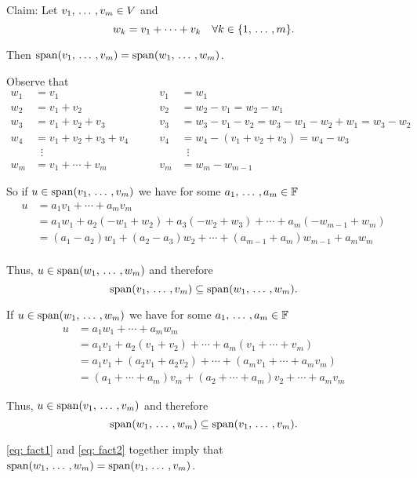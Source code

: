 \begin{xrcs}
  Claim: Let $v_1, {\, \ldots \,\,}, v_m \in V$ and
  \[
    w_k = v_1 + \cdots + v_k \quad \forall k\in \{1, {\, \ldots \,\,}, m\}.
  \]

  Then $\operatorname{span} (v_1, {\, \ldots \,\,}, v_m) = \operatorname{span} (w_1, {\, \ldots \,\,}, w_m)$.
\end{xrcs}
\begin{prf}
  Observe that
  \[
    \begin{aligned}
    w_1 &= v_1
    & \qquad v_1 &= w_1       \\
    w_2 &= v_1 + v_2
    & \qquad v_2 &= w_2-v_1 = w_2 - w_1 \\
    w_3 &= \boxed{v_1 + v_2 + v_3}
    & \qquad v_3 &= w_3-v_1-v_2 = w_3-w_1-w_2+w_1 = w_3 - w_2 \\
    w_4 &= v_1 + v_2 + v_3 + v_4
    & \qquad v_4 &= w_4-\boxed{(v_1 + v_2 + v_3)}=w_4 - w_3 \\
    &\;\;\vdots
    &            &\;\;\vdots \\
    w_m &= v_1 + \cdots + v_m
    & \qquad v_m &= w_m - w_{m-1}
    \end{aligned}
  \]

   So if $u \in \operatorname{span} (v_1, {\, \ldots \,\,}, v_m)$ we have for some $a_1, {\, \ldots \,\,}, a_m \in \mathbb{F}$
  \[
  \begin{aligned}
      u &= a_1 v_1 + \cdots + a_m v_m \\
    &= a_1 w_1 + a_2 (-w_1 + w_2) + a_3(-w_2 + w_3) + \cdots + a_m (-w_{m-1} + w_m) \\
    &= (a_1 - a_2) w_1 + (a_2-a_3) w_2 + \cdots + (a_{m-1} + a_m) w_{m-1} + a_m w_m \\
  \end{aligned}
  \]

  Thus, $u \in \operatorname{span} (w_1, {\, \ldots \,\,}, w_m)$ and therefore
  \begin{equation}
    \label{eq: fact1}
    \operatorname{span} (v_1, {\, \ldots \,\,}, v_m) \subseteq \operatorname{span} (w_1, {\, \ldots \,\,}, w_m).
  \end{equation}


   If $u \in \operatorname{span} (w_1, {\, \ldots \,\,}, w_m)$ we have for some $a_1, {\, \ldots \,\,}, a_m \in \mathbb{F}$
  \[
  \begin{aligned}
    u &= a_1 w_1 + \cdots + a_m w_m \\
    &= a_1 v_1 + a_2 (v_1+v_2) + \cdots + a_m(v_1 + \cdots + v_m) \\
    &= a_1 v_1 + (a_2 v_1+ a_2 v_2) + \cdots + (a_m v_1 + \cdots + a_m v_m) \\
    &= (a_1 + \cdots + a_m) v_m + (a_2 + \cdots + a_m) v_2 + \cdots + a_m v_m
  \end{aligned}
  \]

  Thus, $u \in \operatorname{span} (v_1, {\, \ldots \,\,}, v_m)$ and therefore
  \begin{equation}
    \label{eq: fact2}
    \operatorname{span} (w_1, {\, \ldots \,\,}, w_m) \subseteq \operatorname{span} (v_1, {\, \ldots \,\,}, v_m).
  \end{equation}

  \eqref{eq: fact1} and \eqref{eq: fact2} together imply that $\operatorname{span} (w_1, {\, \ldots \,\,}, w_m) = \operatorname{span} (v_1, {\, \ldots \,\,}, v_m)$.
\end{prf}
